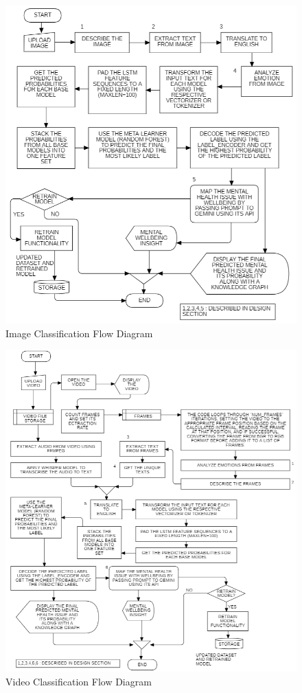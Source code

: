 \pagebreak
\begin{figure}[h!]  
    \centering
    \includegraphics[width=1.0\textwidth]{Images/APP IMAGE OPTION.png}  
    \caption{Image Classification Flow Diagram}
    \label{011232i}  %
\end{figure}

\pagebreak
\begin{figure}[h!]  
    \centering
    \includegraphics[width=1.0\textwidth]{Images/APP VIDEO OPTION.png}  
    \caption{Video Classification Flow Diagram}
    \label{01332i}  %
\end{figure}


